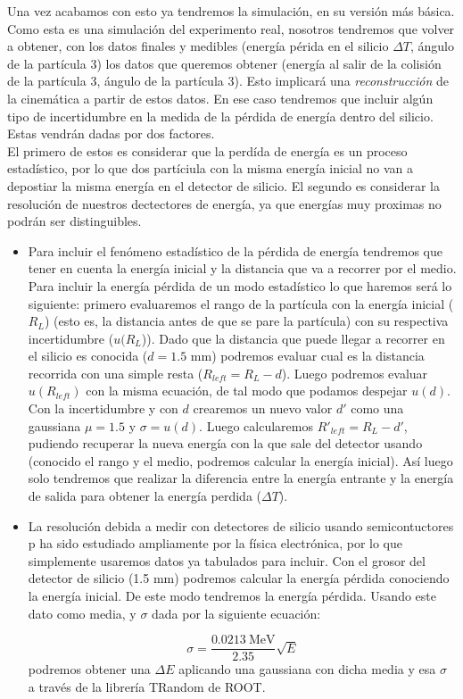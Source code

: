 \documentclass[12pt,a4paper]{article}
\numberwithin{equation}{section}
\numberwithin{figure}{section}
\begin{document}
Una vez acabamos con esto ya tendremos la simulación, en su versión más básica. Como esta es una simulación del experimento real, nosotros tendremos que volver a obtener, con los datos finales y medibles (energía périda en el silicio $\Delta T$, ángulo de la partícula 3) los datos que queremos obtener (energía al salir de la colisión de la partícula 3, ángulo de la partícula 3). Esto implicará una {\it reconstrucción} de la cinemática a partir de estos datos. En ese caso tendremos que incluir algún tipo de incertidumbre en la medida de la pérdida de energía dentro del silicio. Estas vendrán dadas por dos factores. \\


El primero de estos es considerar que la perdída de energía es un proceso estadístico, por lo que dos partíciula con la misma energía inicial no van a depostiar la misma energía en el detector de silicio. El segundo es considerar la resolución de nuestros dectectores de energía, ya que energías muy proximas no podrán ser distinguibles. 

\begin{itemize}
    \item Para incluir el fenómeno estadístico de la pérdida de energía tendremos que tener en cuenta la energía inicial y la distancia que va a recorrer por el medio. Para incluir la energía pérdida de un modo estadístico lo que haremos será lo siguiente: primero evaluaremos el rango de la partícula con la energía inicial ($R_L$) (esto es, la distancia antes de que se pare la partícula) con su respectiva incertidumbre ($u(R_L$)). Dado que la distancia que puede llegar a recorrer en el silicio es conocida ($d=1.5$ mm) podremos evaluar cual es la distancia recorrida con una simple resta ($R_{left}=R_L-d$). Luego podremos evaluar $u(R_{left})$ con la misma ecuación, de tal modo que podamos despejar $u(d)$. Con la incertidumbre y con $d$ crearemos un nuevo valor $d'$ como una gaussiana $\mu=1.5$ y $\sigma=u(d)$. Luego calcularemos $R'_{left}=R_{L}-d'$, pudiendo recuperar la nueva energía con la que sale del detector usando (conocido el rango y el medio, podremos calcular la energía inicial). Así luego solo tendremos que realizar la diferencia entre la energía entrante y la energía de salida para obtener la energía perdida ($\Delta T$). 
    
    \item La resolución debida a medir con detectores de silicio usando semicontuctores p ha sido estudiado ampliamente por la física electrónica, por lo que simplemente usaremos datos ya tabulados para incluir. Con el grosor del detector de silicio (1.5 mm) podremos calcular la energía pérdida conociendo la energía inicial. De este modo tendremos la energía pérdida. Usando este dato como media, y $\sigma$ dada por la siguiente ecuación: 
    
    \begin{equation}
        \sigma = \frac{0.0213 \  \text{MeV}}{2.35} \sqrt{E}
    \end{equation}
    podremos obtener una $\Delta E$ aplicando una gaussiana con dicha media y esa $\sigma$ a través de la librería TRandom de ROOT. 

\end{itemize}
\end{document}
